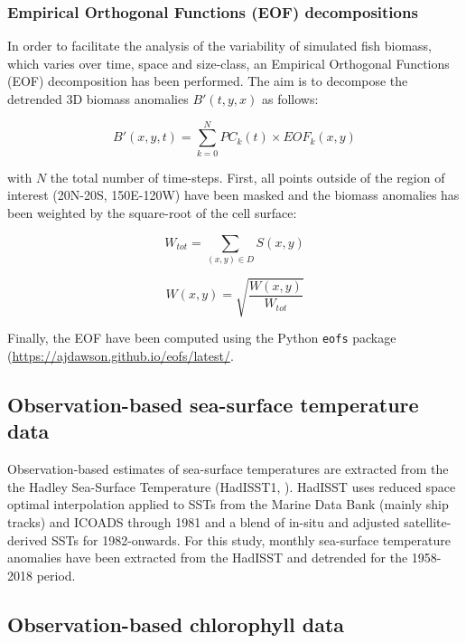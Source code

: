 \subsubsection{Empirical Orthogonal Functions (EOF) decompositions}
\label{sec:eof}

In order to facilitate the analysis of the variability of simulated fish biomass, which varies over time, space and size-class, an Empirical Orthogonal Functions (EOF) decomposition has been performed. The aim is to decompose the detrended 3D biomass anomalies $B'(t, y, x)$ as follows: 

\begin{equation}
B'(x,y,t) = \sum_{k=0}^{N} PC_k(t) \times EOF_k(x,y)
\end{equation}

with $N$ the total number of time-steps. First, all points outside of the region of interest (20N-20S, 150E-120W) have been masked and the biomass anomalies has been weighted by the square-root of the cell surface:

\begin{displaymath}
W_{tot} = \sum_{(x, y) \in D} S(x,y)
\end{displaymath}

\begin{displaymath}
W(x, y) = \sqrt{\frac{W(x, y)}{W_{tot}}}
\end{displaymath}

Finally, the EOF have been computed using the Python \verb+eofs+ package (\url{https://ajdawson.github.io/eofs/latest/}.

\subsection{Observation-based sea-surface temperature data}

Observation-based estimates of sea-surface temperatures are extracted from the the Hadley Sea-Surface Temperature (HadISST1, \citealt{raynerGlobalAnalysesSea2003}). HadISST uses reduced space optimal interpolation applied to SSTs from the Marine Data Bank (mainly ship tracks) and ICOADS through 1981 and a blend of in-situ and adjusted satellite-derived SSTs for 1982-onwards. For this study, monthly sea-surface temperature anomalies have been extracted from the HadISST and detrended for the 1958-2018 period. 

\subsection{Observation-based chlorophyll data}


